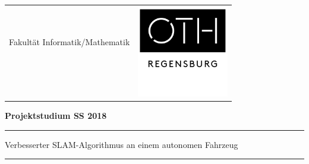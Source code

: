 

\titlepage

\begin{center}

\begin{tabular}{cc}
& \multirow{5}{*}{
\includegraphics[height=4.0cm]{images/cover_sheet/OTH_Regensburg_neues_Logo_01}}\tabularnewline

{\large{}Fakultät Informatik/Mathematik}\hspace{1.5cm} & \tabularnewline
 & \tabularnewline
 & \tabularnewline
 & \tabularnewline
\end{tabular}
\par\end{center}

\noindent 
\vspace{2.5cm}


\noindent \begin{center}
\textbf{\huge{}Projektstudium SS 2018}
\par\end{center}{\Large \par}

\vspace{0.5cm}
\noindent
\rule{\textwidth}{0.3pt}


\begin{doublespace}
\noindent \begin{center}
{\Large{Verbesserter SLAM-Algorithmus an einem autonomen Fahrzeug}}
\par\end{center}{\large \par}
\end{doublespace}
\vspace{-0.5cm}
\noindent\rule{\textwidth}{0.3pt}



\vspace{3.0cm}


